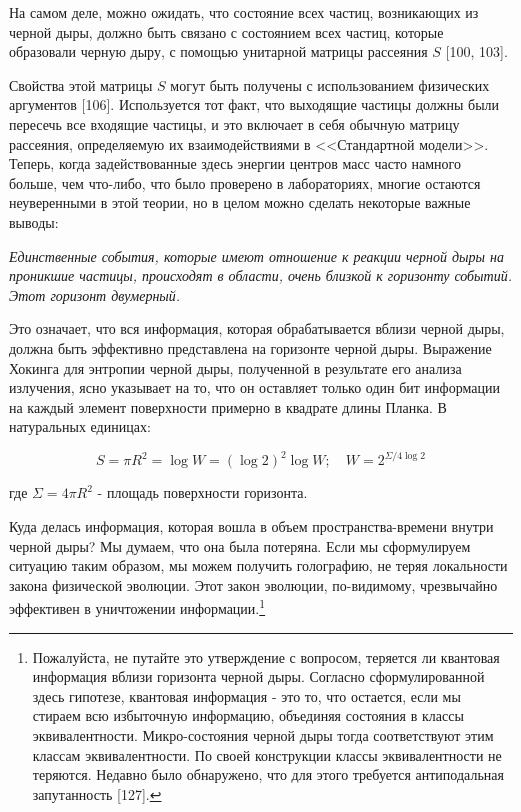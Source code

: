 \documentclass[main.tex]{subfiles}
\begin{document}
На самом деле, можно ожидать, что состояние всех частиц, возникающих из черной дыры, должно быть связано с состоянием всех частиц, которые образовали черную дыру, с помощью унитарной матрицы рассеяния $S$ [100, 103].

Свойства этой матрицы $S$ могут быть получены с использованием физических аргументов [106]. Используется тот факт, что выходящие частицы должны были пересечь все входящие частицы, и это включает в себя обычную матрицу рассеяния, определяемую их взаимодействиями в <<Стандартной модели>>. Теперь, когда задействованные здесь энергии центров масс часто намного больше, чем что-либо, что было проверено в лабораториях, многие остаются неуверенными в этой теории, но в целом можно сделать некоторые важные выводы:

\textit{Единственные события, которые имеют отношение к реакции черной дыры на проникшие частицы, происходят в области, очень близкой к горизонту событий. Этот горизонт двумерный.}

Это означает, что вся информация, которая обрабатывается вблизи черной дыры, должна быть эффективно представлена на горизонте черной дыры. Выражение Хокинга для энтропии черной дыры, полученной в результате его анализа излучения, ясно указывает на то, что он оставляет только один бит информации на каждый элемент поверхности примерно в квадрате длины Планка. В натуральных единицах:

\begin{equation}\label{9.8}
	S = \pi R^2 = \log W = (\log 2)^2\log W; \quad W = 2^{\Sigma/4\log 2}
\end{equation}
                         
где $\Sigma = 4\pi R^2$ - площадь поверхности горизонта.

Куда делась информация, которая вошла в объем пространства-времени внутри черной дыры? Мы думаем, что она была потеряна. Если мы сформулируем ситуацию таким образом, мы можем получить голографию, не теряя локальности закона физической эволюции. Этот закон эволюции, по-видимому, чрезвычайно эффективен в уничтожении информации.\footnote{Пожалуйста, не путайте это утверждение с вопросом, теряется ли квантовая информация вблизи горизонта черной дыры. Согласно сформулированной здесь гипотезе, квантовая информация - это то, что остается, если мы стираем всю избыточную информацию, объединяя состояния в классы эквивалентности. Микро-состояния черной дыры тогда соответствуют этим классам эквивалентности. По своей конструкции классы эквивалентности не теряются. Недавно было обнаружено, что для этого требуется антиподальная запутанность [127].}
\end{document}
